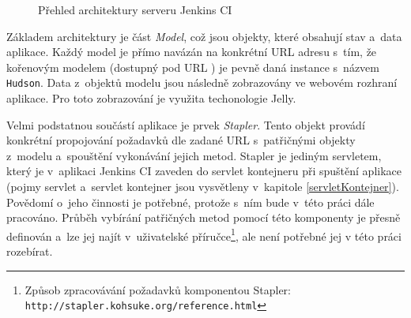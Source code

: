             \begin{figure}[ht]
                \begin{center}
                    \caption{Přehled architektury serveru Jenkins CI \cite{architectureOverview}}
                    \label{imgJenkinsArchitecture}
                \end{center}
            \end{figure}     

            Základem architektury je část \emph{Model}, což jsou objekty, které obsahují stav
            a~data aplikace. Každý model je přímo navázán na konkrétní URL adresu s~tím, že kořenovým
            modelem (dostupný pod URL \uv{/}) je pevně daná instance s~názvem \texttt{Hudson}.
            Data z~objektů modelu jsou následně zobrazovány ve webovém rozhraní aplikace.
            Pro toto zobrazování je využita techonologie Jelly.

            Velmi podstatnou součástí aplikace je prvek \emph{Stapler}. Tento objekt
            provádí konkrétní propojování požadavků dle zadané URL s~patřičnými objekty
            z~modelu a~spouštění vykonávání jejich metod. Stapler je
            jediným servletem, který je v~aplikaci Jenkins CI zaveden do
            servlet kontejneru při spuštění aplikace (pojmy servlet a~servlet kontejner 
            jsou vysvětleny v~kapitole \ref{servletKontejner}).
            Povědomí o~jeho
            činnosti je potřebné, protože s~ním bude v~této práci dále pracováno.
            Průběh vybírání patřičných metod pomocí této komponenty je přesně
            definován a~lze jej najít v~uživatelské příručce\footnote{
                Způsob zpracovávání požadavků komponentou Stapler:
                \texttt{http://stapler.kohsuke.org/reference.html}}, 
                ale není potřebné jej v této práci rozebírat.

